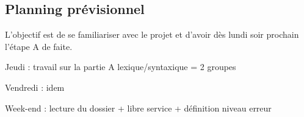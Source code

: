 \documentclass[10pt,a4paper]{article}
\begin{document}
\newpage

\subsection*{Planning prévisionnel}
L'objectif est de se familiariser avec le projet et d'avoir dès lundi soir prochain l'étape A de faite.
\begin{description}
\item Jeudi : travail sur la partie A {lexique/syntaxique = 2 groupes}
\item Vendredi : idem
\item Week-end : lecture du dossier + libre service + définition niveau erreur
\end{description}
\end{document}
